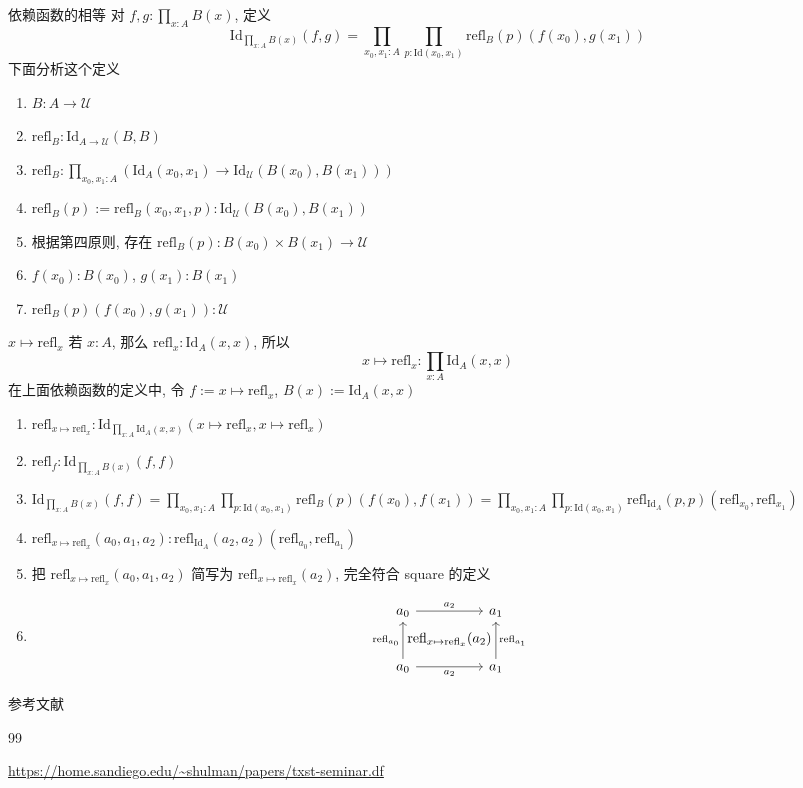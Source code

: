 \documentclass{beamer}
\newcommand{\Id}{\text{Id}}
\newcommand{\refl}{\text{refl}}
\newcommand{\UU}{\mathcal{U}}
\begin{document}
\begin{frame}{依赖函数的相等}
对 $f,g : \prod_{x:A}B(x)$, 定义
\[
\Id_{\prod_{x:A}B(x)}(f,g) = \prod_{x_0,x_1:A}\prod_{p:\Id(x_0,x_1)}\refl_B(p)(f(x_0),g(x_1))
\]
下面分析这个定义
\begin{enumerate}
  \item $B : A \to \UU$
  \item $\refl_B : \Id_{A\to\UU}(B,B)$
  \item $\refl_B : \prod_{x_0,x_1:A}(\Id_A(x_0,x_1)\to \Id_{\UU}(B(x_0),B(x_1)))$
  \item $\refl_B(p) := \refl_B(x_0,x_1,p) : \Id_{\UU}(B(x_0),B(x_1))$
  \item 根据第四原则, 存在 $\refl_B(p) : B(x_0) \times B(x_1) \to \UU$
  \item $f(x_0) : B(x_0)$, $g(x_1) : B(x_1)$
  \item $\refl_B(p)(f(x_0),g(x_1)) : \UU$
\end{enumerate}
\end{frame}

\begin{frame}[fragile]{$x\mapsto\refl_x$}
  若 $x : A$, 那么 $\refl_x : \Id_A(x,x)$, 所以
  \[
    x \mapsto \refl_x : \prod_{x:A}\Id_A(x,x)
  \]
  在上面依赖函数的定义中, 令 $f := x\mapsto \refl_x$, $B(x) := \Id_A(x,x)$
  \begin{enumerate}
    \item $\refl_{x\mapsto\refl_x} : \Id_{\prod_{x:A}\Id_A(x,x)}(x\mapsto\refl_x,x\mapsto\refl_x)$
    \item $\refl_f : \Id_{\prod_{x:A}B(x)}(f,f)$
    \item $\Id_{\prod_{x:A}B(x)}(f,f) = \prod_{x_0,x_1:A}\prod_{p:\Id(x_0,x_1)}\refl_B(p)(f(x_0),f(x_1)) = \prod_{x_0,x_1:A}\prod_{p:\Id(x_0,x_1)}\refl_{\Id_A}(p,p)(\refl_{x_0},\refl_{x_1})$
    \item $\refl_{x\mapsto\refl_x}(a_0,a_1,a_2) : \refl_{\Id_A}(a_2,a_2)(\refl_{a_0},\refl_{a_1})$
    \item 把 $\refl_{x\mapsto\refl_x}(a_0,a_1,a_2)$ 简写为 $\refl_{x\mapsto\refl_x}(a_2)$, 完全符合 square 的定义
    \item \[
    \begin{tikzcd}[row sep=large, column sep=huge]
a_{0} \arrow[r, "a_{2}"] & a_{1}  \\
a_{0} \arrow[u, "{\refl_{a_0}}"] \arrow[r, "a_{2}"'] \arrow[ur, phantom, "{\refl_{x\mapsto\refl_x}(a_2)}"] & a_{1} \arrow[u, "{\refl_{a_1}}"']
\end{tikzcd}
    \]
  \end{enumerate}

\end{frame}


\begin{frame}[allowframebreaks]{参考文献}
\begin{thebibliography}{99}

\url{https://home.sandiego.edu/~shulman/papers/txst-seminar.df}

\end{thebibliography}
\end{frame}
\end{document}
